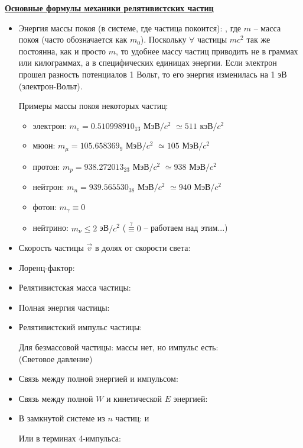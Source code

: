 \newpage
\underline{\bf Основные формулы механики релятивистских частиц}

\sf\large

\begin{itemize}
 \item Энергия массы покоя (в системе, где частица покоится): , где $m$ -- масса покоя (часто обозначается как $m_0$). Поскольку $\forall$ частицы $mc^2$ так же постоянна, как и просто $m$, то удобнее массу частиц приводить не в граммах или килограммах, а в специфических единицах энергии. Если электрон прошел разность потенциалов 1 Вольт, то его энергия изменилась на 1 эВ (электрон-Вольт).
     
     Примеры массы покоя некоторых частиц: \begin{itemize}
     \item электрон: $m_e=0.510998910_{13}$ МэВ$/c^2$ $\simeq511$ кэВ$/c^2$
     \item мюон: $m_\mu=105.658369_{9}$ МэВ$/c^2$ $\simeq105$ МэВ$/c^2$
     \item протон:  $m_p=938.272013_{23}$ МэВ$/c^2$ $\simeq938$ МэВ$/c^2$
     \item нейтрон: $m_n=939.565530_{38}$ МэВ$/c^2$ $\simeq940$ МэВ$/c^2$
     \item фотон: $m_\gamma\equiv0$
     \item нейтрино: $m_\nu\leq 2$ эВ$/c^2$ ($\stackrel{?}{\equiv}0$  -- работаем над этим...)
     \end{itemize}
 \item Скорость частицы $\vec{v}$ в долях от скорости света:      
 \item Лоренц-фактор: 
 \item Релятивистская масса частицы: 
 \item Полная энергия частицы: 
 \item Релятивистский импульс частицы: 
     
     Для безмассовой частицы: массы нет, но импульс есть: \\ (Световое давление)
 \item Связь между полной энергией и импульсом: 
 \item Связь между полной $W$ и кинетической $E$ энергией: 
 \item В замкнутой системе из $n$ частиц:  и 
     
     Или в терминах 4-импульса:
\end{itemize}
